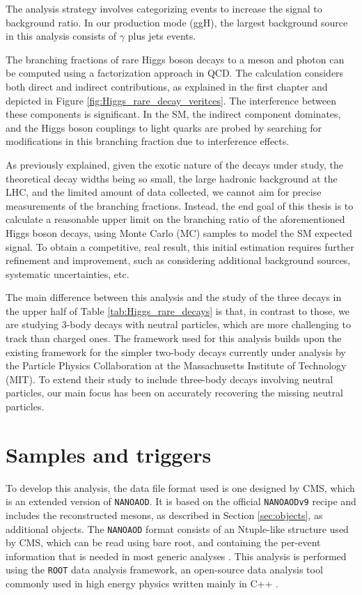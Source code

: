 The analysis strategy involves categorizing events to increase the signal to background ratio. In our production mode (ggH), the largest background source in this analysis consists of $\gamma$ plus jets events.

The branching fractions of rare Higgs boson decays to a meson and photon can be computed using a factorization approach in QCD. The calculation considers both direct and indirect contributions, as explained in the first chapter and depicted in Figure \ref{fig:Higgs_rare_decay_veritces}. The interference between these components is significant. In the SM, the indirect component dominates, and the Higgs boson couplings to light quarks are probed by searching for modifications in this branching fraction due to interference effects.

As previously explained, given the exotic nature of the decays under study, the theoretical decay widths being so small, the large hadronic background at the LHC, and the limited amount of data collected, we cannot aim for precise measurements of the branching fractions. Instead, the end goal of this thesis is to calculate a reasonable upper limit on the branching ratio of the aforementioned Higgs boson decays, using Monte Carlo (MC) samples to model the SM expected signal. To obtain a competitive, real result, this initial estimation requires further refinement and improvement, such as considering additional background sources, systematic uncertainties, etc.

The main difference between this analysis and the study of the three decays in the upper half of Table \ref{tab:Higgs_rare_decays} is that, in contrast to those, we are studying 3-body decays with neutral particles, which are more challenging to track than charged ones. The framework used for this analysis builds upon the existing framework for the simpler two-body decays currently under analysis by the Particle Physics Collaboration at the Massachusetts Institute of Technology (MIT). To extend their study to include three-body decays involving neutral particles, our main focus has been on accurately recovering the missing neutral particles.

\section{Samples and triggers}\label{sec:samples_triggers}

To develop this analysis, the data file format used is one designed by CMS, which is an extended version of \verb+NANOAOD+. It is based on the official \verb+NANOAODv9+ recipe and includes the reconstructed mesons, as described in Section \ref{sec:objects}, as additional objects. The \verb+NANOAOD+ format consists of an Ntuple-like structure used by CMS, which can be read using bare root, and containing the per-event information that is needed in most generic analyses \cite{CMS:NanoAOD}. This analysis is performed using the \verb+ROOT+ data analysis framework, an open-source data analysis tool commonly used in high energy physics written mainly in C++ \cite{CERN:root}.

